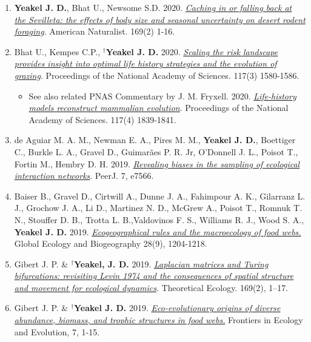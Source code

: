 \documentclass[margin,line,12pt]{res}
\begin{document}
\begin{resume}
\begin{enumerate}
\item \textbf{Yeakel J. D.}, Bhat U., Newsome S.D. 2020. \href{https://www.journals.uchicago.edu/doi/10.1086/709019}{\emph{Caching in or falling back at the Sevilleta: the effects of body size and seasonal uncertainty on desert rodent foraging}}. American Naturalist. 169(2) 1-16.

\item Bhat U., Kempes C.P., \textbf{${}^\dag$Yeakel J. D.} 2020. \href{https://doi.org/10.1073/pnas.1907998117}{\emph{Scaling the risk landscape provides insight into optimal life history strategies and the evolution of grazing}}. Proceedings of the National Academy of Sciences.  117(3) 1580-1586.
  {\footnotesize
	\begin{itemize}
		\item See also related PNAS Commentary by J. M. Fryxell. 2020. \href{https://www.pnas.org/content/117/4/1839}{\emph{Life-history models reconstruct mammalian evolution}}. Proceedings of the National Academy of Sciences. 117(4) 1839-1841.
	\end{itemize}
  }
\item de Aguiar M. A. M., Newman E. A., Pires M. M., \textbf{Yeakel J. D.}, Boettiger C., Burkle L. A., Gravel D., Guimar\~aes P. R. Jr, O’Donnell J. L., Poisot T., Fortin M., Hembry D. H. 2019. \href{https://peerj.com/articles/7566/}{\emph{Revealing biases in the sampling of ecological interaction networks}}. PeerJ. 7, e7566.

\item Baiser B., Gravel D., Cirtwill A., Dunne J. A., Fahimpour A. K., Gilarranz L. J., Grochow J. A., Li D., Martinez N. D., McGrew A., Poisot T., Romnuk T. N., Stouffer D. B., Trotta L. B.,Valdovinos F. S., Williams R. J., Wood S. A., \textbf{Yeakel J. D.} 2019. \href{https://onlinelibrary.wiley.com/doi/abs/10.1111/geb.12925}{\emph{Ecogeographical rules and the macroecology of food webs.}} Global Ecology and Biogeography 28(9), 1204-1218.

\item Gibert J. P. \& \textbf{${}^\dag$Yeakel, J. D.} 2019. \href{https://link.springer.com/article/10.1007/s12080-018-0403-2}{\emph{Laplacian matrices and Turing bifurcations: revisiting Levin 1974 and the consequences of spatial structure and movement for ecological dynamics}}. Theoretical Ecology. 169(2), 1–17.

\item Gibert J. P. \& \textbf{${}^\dag$Yeakel J. D.} 2019. \href{https://www.frontiersin.org/articles/10.3389/fevo.2019.00015/full}{\emph{Eco-evolutionary origins of diverse abundance, biomass, and trophic structures in food webs.}} Frontiers in Ecology and Evolution, 7, 1-15.
  

\end{enumerate}
\end{resume}
\end{document}
